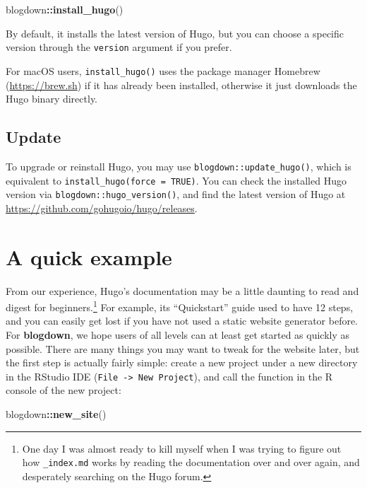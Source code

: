 \documentclass[12pt,]{krantz}
\makeatletter
\newenvironment{Shaded}{\begin{snugshade}}{\end{snugshade}}
\newcommand{\KeywordTok}[1]{\textcolor[rgb]{0.13,0.29,0.53}{\textbf{#1}}}
\newcommand{\NormalTok}[1]{#1}
\newcommand{\OperatorTok}[1]{\textcolor[rgb]{0.81,0.36,0.00}{\textbf{#1}}}
\newenvironment{kframe}{%
\medskip{}
\setlength{\fboxsep}{.8em}
 \def\at@end@of@kframe{}%
 \ifinner\ifhmode%
  \def\at@end@of@kframe{\end{minipage}}%
  \begin{minipage}{\columnwidth}%
 \fi\fi%
 \def\FrameCommand##1{\hskip\@totalleftmargin \hskip-\fboxsep
 \colorbox{shadecolor}{##1}\hskip-\fboxsep
     \hskip-\linewidth \hskip-\@totalleftmargin \hskip\columnwidth}%
 \MakeFramed {\advance\hsize-\width
   \@totalleftmargin\z@ \linewidth\hsize
   \@setminipage}}%
 {\par\unskip\endMakeFramed%
 \at@end@of@kframe}
\renewenvironment{Shaded}{\begin{kframe}}{\end{kframe}}
\theoremstyle{definition}
\theoremstyle{definition}
\theoremstyle{definition}
\theoremstyle{remark}
\makeatother
\begin{document}
\begin{Shaded}
\begin{Highlighting}[]
\NormalTok{blogdown}\OperatorTok{::}\KeywordTok{install_hugo}\NormalTok{()}
\end{Highlighting}
\end{Shaded}

By default, it installs the latest version of Hugo, but you can choose a
specific version through the \texttt{version} argument if you prefer.

For macOS users, \texttt{install\_hugo()} uses the package manager
Homebrew (\url{https://brew.sh}) if it has already been installed,
otherwise it just downloads the Hugo binary directly.

\hypertarget{update}{%
\subsection{Update}\label{update}}

To upgrade or reinstall Hugo, you may use
\texttt{blogdown::update\_hugo()}, which is equivalent to
\texttt{install\_hugo(force\ =\ TRUE)}. You can check the installed Hugo
version via \texttt{blogdown::hugo\_version()}, and find the latest
version of Hugo at \url{https://github.com/gohugoio/hugo/releases}.

\hypertarget{a-quick-example}{%
\section{A quick example}\label{a-quick-example}}

From our experience, Hugo's documentation may be a little daunting to
read and digest for beginners.\footnote{One day I was almost ready to
  kill myself when I was trying to figure out how \texttt{\_index.md}
  works by reading the documentation over and over again, and
  desperately searching on the Hugo forum.} For example, its
``Quickstart'' guide used to have 12 steps, and you can easily get lost
if you have not used a static website generator before. For
\textbf{blogdown}, we hope users of all levels can at least get started
as quickly as possible. There are many things you may want to tweak for
the website later, but the first step is actually fairly simple: create
a new project under a new directory in the RStudio IDE
(\texttt{File\ -\textgreater{}\ New\ Project}), and call the function in
the R console of the new project:

\begin{Shaded}
\begin{Highlighting}[]
\NormalTok{blogdown}\OperatorTok{::}\KeywordTok{new_site}\NormalTok{()}
\end{Highlighting}
\end{Shaded}
\end{document}
